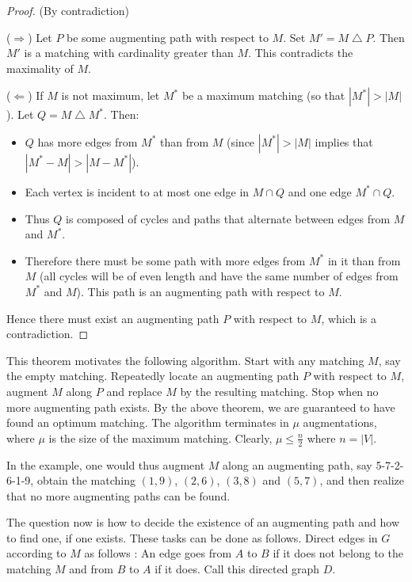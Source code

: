 \documentclass[12pt]{article}
\begin{document}
\begin{proof}(By contradiction)

($\Rightarrow$)  Let $P$ be some augmenting
path with respect to $M$.  Set $M' = M \bigtriangleup P$.  Then $M'$ is
a matching with cardinality greater than $M$.  This contradicts the
maximality of $M$.

($\Leftarrow$)  If $M$ is not maximum, let $M^*$ be a maximum matching
(so that $|M^*| > |M|$).  Let $Q = M \bigtriangleup M^*$.  Then:

\begin{itemize}
\item $Q$ has more edges from $M^*$ than from $M$ (since $|M^*| > |M|$
implies that $|M^*-M|> |M-M^*|$).

\item Each vertex is incident to at most one edge in $M \cap Q$ and
one edge $M^{*} \cap Q$.

\item Thus $Q$ is composed of cycles and paths that alternate between
edges from $M$ and $M^*$.

\item Therefore there must be some path with more edges from $M^*$ in
it than from $M$ (all cycles will be of even length and have the same
number of edges from $M^*$ and $M$).  This path is an augmenting path
with respect to $M$.
\end{itemize}

Hence there must exist an augmenting path $P$ with respect to $M$, which
is a contradiction.
\end{proof}

This theorem motivates the following algorithm.  Start with any
matching $M$, say the empty matching. Repeatedly locate an augmenting
path $P$ with respect to $M$, augment $M$ along $P$ and replace $M$ by
the resulting matching. Stop when no more augmenting path exists. By
the above theorem, we are guaranteed to have found an optimum
matching. The algorithm terminates in $\mu$ augmentations, where $\mu$
is the size of the maximum matching. Clearly, $\mu\leq \frac{n}{2}$
where $n=|V|$.

In the example, one would thus augment $M$ along an augmenting path,
say 5-7-2-6-1-9, obtain the matching $(1,9)$, $(2,6)$, $(3,8)$ and
$(5,7)$, and then realize that no more augmenting paths can be found.

The question now is how to decide the existence of an
augmenting path and how to find one, if one exists.
These tasks can be done as follows. 
Direct edges in $G$ according to $M$ as follows :
An edge goes from $A$ to $B$ if it
does not belong to the matching $M$ and from $B$ to $A$ if it does.
Call this directed graph $D$. 
\end{document}
